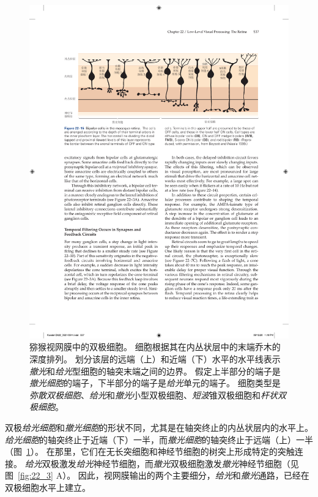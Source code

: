 \begin{figure}[htbp]
	\centering
	\includegraphics[width=1.0\linewidth]{chap22/fig_22_15}
	\caption{猕猴视网膜中的双极细胞。
		细胞根据其在内丛状层中的末端乔木的深度排列。
		划分该层的远端（上）和近端（下）水平的水平线表示\textit{撤光}和\textit{给光}型细胞的轴突末端之间的边界。
		假定上半部分的端子是 \textit{撤光细胞}的端子，下半部分的端子是\textit{给光}单元的端子。
		细胞类型是\textit{弥散双极细胞}、\textit{给光}和\textit{撤光}小型双极细胞、\textit{短波}锥双极细胞和\textit{杆状双极细胞}。}
	\label{fig:22_15}
\end{figure}


双极\textit{给光细胞}和\textit{撤光细胞}的形状不同，尤其是在轴突终止的内丛状层内的水平上。
\textit{给光细胞}的轴突终止于近端（下）一半，而\textit{撤光细胞}的轴突终止于远端（上）一半（图~\ref{fig:22_15}）。
在那里，它们在无长突细胞和神经节细胞的树突上形成特定的突触连接。
\textit{给光}双极激发\textit{给光}神经节细胞，而\textit{撤光}双极细胞激发\textit{撤光}神经节细胞（见图~\ref{fig:22_3} A）。
因此，视网膜输出的两个主要细分，\textit{给光}和\textit{撤光}通路，已经在双极细胞水平上建立。


